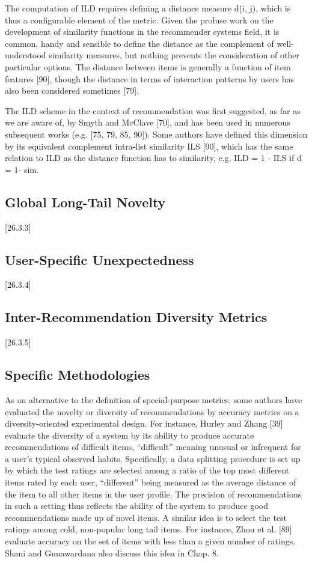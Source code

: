 The computation of ILD requires defining a distance measure d(i, j), which is thus a configurable element of the metric. Given the profuse work on the development of similarity functions in the recommender systems field, it is common, handy and sensible to define the distance as the complement of well-understood similarity measures, but nothing prevents the consideration of other particular options. The distance between items is generally a function of item features [90], though the distance in terms of interaction patterns by users has also been considered sometimes [79].


The ILD scheme in the context of recommendation was first suggested, as far as we are aware of, by Smyth and McClave [70], and has been used in numerous subsequent works (e.g. [75, 79, 85, 90]). Some authors have defined this dimension by its equivalent complement intra-list similarity ILS [90], which has the same relation to ILD as the distance function has to similarity, e.g. ILD = 1 - ILS if d = 1- sim.

\subsection{Global Long-Tail Novelty}
[26.3.3]

\subsection{User-Specific Unexpectedness}
[26.3.4]

\subsection{Inter-Recommendation Diversity Metrics}
[26.3.5]

\subsection{Specific Methodologies}

As an alternative to the definition of special-purpose metrics, some authors have evaluated the novelty or diversity of recommendations by accuracy metrics on a diversity-oriented experimental design. For instance, Hurley and Zhang [39] evaluate the diversity of a system by its ability to produce accurate recommendations of difficult items, “difficult” meaning unusual or infrequent for a user’s typical observed habits. Specifically, a data splitting procedure is set up by which the test ratings are selected among a ratio of the top most different items rated by each user, “different” being measured as the average distance of the item to all other items in the user profile. The precision of recommendations in such a setting thus reflects the ability of the system to produce good recommendations made up of novel items. A similar idea is to select the test ratings among cold, non-popular long tail items. For instance, Zhou et al. [89] evaluate accuracy on the set of items with less than a given number of ratings. Shani and Gunawardana also discuss this idea in Chap. 8.

